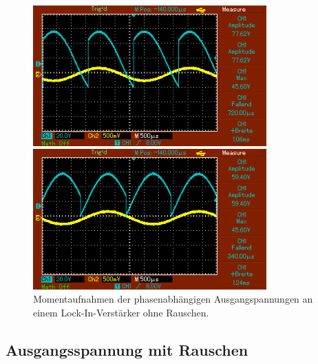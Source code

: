 \begin{figure}
\begin{minipage}{0.5\textwidth}
        \caption{$\phi = \SI{240}{\degree}$.} 
        \label{fig:16}
    \end{minipage}
    \vspace{1cm}
    \vfill
    \begin{minipage}{0.5\textwidth}
        \centering
        \includegraphics[width=0.8\textwidth]{bilder/300ohne.png}
        \caption{$\phi = \SI{300}{\degree}$.} 
        \label{fig:17}
    \end{minipage}
    \hfill
    \begin{minipage}{0.5\textwidth}
        \centering
        \includegraphics[width=0.8\textwidth]{bilder/360ohne.png}
        \caption{$\phi = \SI{360}{\degree}$.} 
        \label{fig:18}
    \end{minipage}
    \caption{Momentaufnahmen der phasenabhängigen Ausgangspannungen an einem Lock-In-Verstärker ohne Rauschen.}
\end{figure}

\subsection{Ausgangsspannung mit Rauschen}
